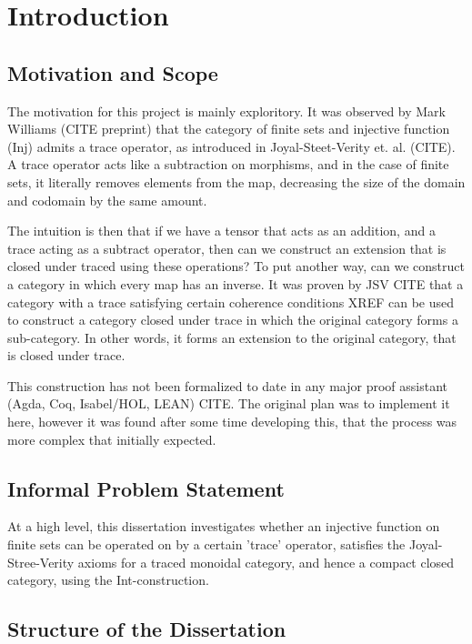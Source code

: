 \chapter{Introduction}
\section{Motivation and Scope}

The motivation for this project is mainly exploritory. It was observed
by Mark Williams (CITE preprint) that the category of finite sets and
injective function (\textrm{Inj}) admits a trace operator, as
introduced in Joyal-Steet-Verity et. al. (CITE). A trace operator acts
like a subtraction on morphisms, and in the case of finite sets, it
literally removes elements from the map, decreasing the size of the
domain and codomain by the same amount.

The intuition is then that if we have a tensor that acts as an
addition, and a trace acting as a subtract operator, then can we
construct an extension that is closed under traced using these
operations? To put another way, can we construct a category in
which every map has an inverse. It was proven by JSV CITE that a
category with a trace satisfying certain coherence conditions XREF can
be used to construct a category closed under trace in which the
original category forms a sub-category. In other words, it forms an
extension to the original category, that is closed under trace.

This construction has not been formalized to date in any major proof
assistant (Agda, Coq, Isabel/HOL, LEAN) CITE. The original plan was to
implement it here, however it was found after some time developing
this, that the process was more complex that initially expected.

\section{Informal Problem Statement}
At a high level, this dissertation investigates whether an injective function
on finite sets can be operated on by a certain 'trace' operator, satisfies the
Joyal-Stree-Verity axioms for a traced monoidal category, and hence a compact
closed category, using the Int-construction.

\section{Structure of the Dissertation}
